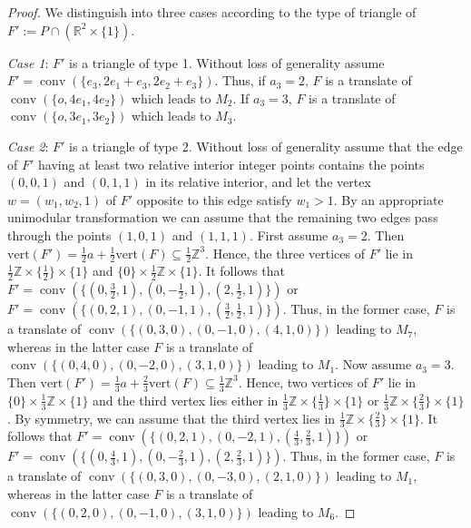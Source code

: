 \documentclass[a4paper]{article}
\theoremstyle{plain}
\begin{document}
\begin{proof}
We distinguish into three cases according to the type of
triangle of $F' := P \cap ({\mathbb{R}}^2 \times \{1\})$.

\emph{Case 1}: $F'$ is a triangle of type 1.
Without loss of generality assume $F' = {{\mathop{\mathrm{{conv}}}}}(\{e_3, 2e_1 +
e_3, 2e_2 + e_3\})$.
Thus, if $a_3 = 2$, $F$ is a translate of ${{\mathop{\mathrm{{conv}}}}}(\{o, 4e_1,
4e_2\})$ which leads to $M_2$.
If $a_3 = 3$, $F$ is a translate of ${{\mathop{\mathrm{{conv}}}}}(\{o, 3e_1,
3e_2\})$ which leads to $M_3$.

\emph{Case 2}: $F'$ is a triangle of type 2.
Without loss of generality assume that the edge of $F'$
having at least two relative interior integer points
contains the points $(0,0,1)$ and $(0,1,1)$ in its relative
interior, and let the vertex $w = (w_1,w_2,1)$ of $F'$
opposite to this edge satisfy $w_1 > 1$.
By an appropriate unimodular transformation we can assume
that the remaining two edges pass through the points
$(1,0,1)$ and $(1,1,1)$.
First assume $a_3 = 2$.
Then ${\mathrm{vert}}(F') = \frac{1}{2}a + \frac{1}{2}{\mathrm{vert}}(F)
\subseteq \frac{1}{2} {\mathbb{Z}}^3$.
Hence, the three vertices of $F'$ lie in $\frac{1}{2} {\mathbb{Z}}
\times \{\frac{1}{2}\} \times\{1\}$ and $\{0\} \times
\frac{1}{2} {\mathbb{Z}} \times\{1\}$.
It follows that $F' = {{\mathop{\mathrm{{conv}}}}}(\{(0,\frac{3}{2},1),
(0,-\frac{1}{2},1), (2,\frac{1}{2},1)\})$ or $F' =
{{\mathop{\mathrm{{conv}}}}}(\{(0,2,1), (0,-1,1), (\frac{3}{2},\frac{1}{2},1)\})$.
Thus, in the former case, $F$ is a translate of
${{\mathop{\mathrm{{conv}}}}}(\{(0,3,0), (0,-1,0), (4,1,0)\})$ leading to $M_7$,
whereas in the latter case $F$ is a translate of
${{\mathop{\mathrm{{conv}}}}}(\{(0,4,0), (0,-2,0), (3,1,0)\})$ leading to $M_1$.
Now assume $a_3 = 3$.
Then ${\mathrm{vert}}(F') = \frac{1}{3}a + \frac{2}{3}{\mathrm{vert}}(F)
\subseteq \frac{1}{3} {\mathbb{Z}}^3$.
Hence, two vertices of $F'$ lie in $\{0\} \times \frac{1}{3}
{\mathbb{Z}} \times\{1\}$ and the third vertex lies either in
$\frac{1}{3} {\mathbb{Z}} \times \{\frac{1}{3}\} \times\{1\}$ or
$\frac{1}{3} {\mathbb{Z}} \times \{\frac{2}{3}\} \times\{1\}$.
By symmetry, we can assume that the third vertex lies in
$\frac{1}{3} {\mathbb{Z}} \times \{\frac{2}{3}\} \times\{1\}$.
It follows that $F' = {{\mathop{\mathrm{{conv}}}}}(\{(0,2,1), (0,-2,1),
(\frac{4}{3},\frac{2}{3},1)\})$ or $F' =
{{\mathop{\mathrm{{conv}}}}}(\{(0,\frac{4}{3},1), (0,-\frac{2}{3},1),
(2,\frac{2}{3},1)\})$.
Thus, in the former case, $F$ is a translate of
${{\mathop{\mathrm{{conv}}}}}(\{(0,3,0), (0,-3,0), (2,1,0)\})$ leading to $M_1$,
whereas in the latter case $F$ is a translate of
${{\mathop{\mathrm{{conv}}}}}(\{(0,2,0), (0,-1,0), (3,1,0)\})$ leading to $M_6$.


\end{proof}
\end{document}
